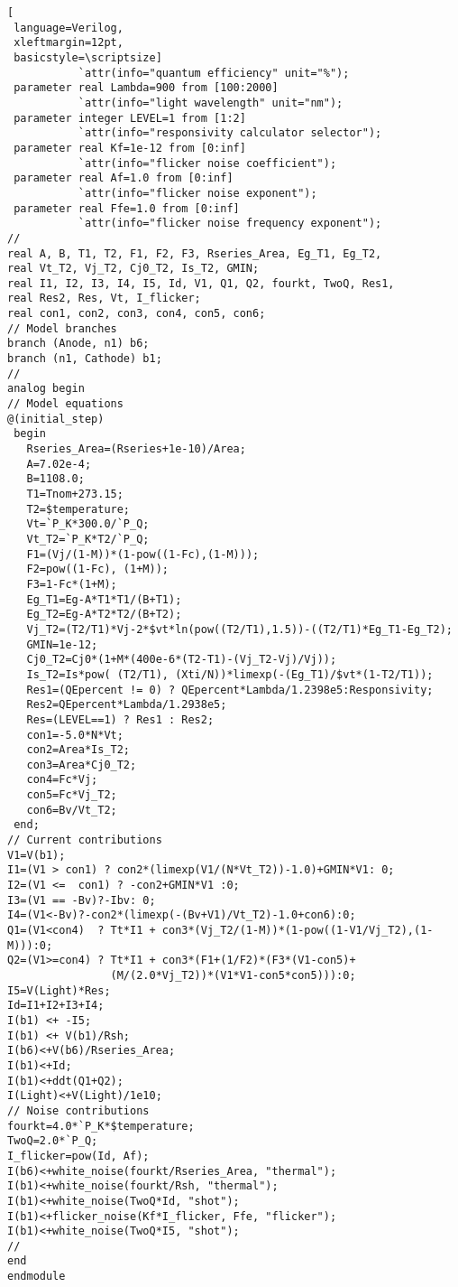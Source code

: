 \begin{lstlisting}[
 language=Verilog, 
 xleftmargin=12pt,
 basicstyle=\scriptsize]
           `attr(info="quantum efficiency" unit="%");
 parameter real Lambda=900 from [100:2000]        
           `attr(info="light wavelength" unit="nm");
 parameter integer LEVEL=1 from [1:2]             
           `attr(info="responsivity calculator selector");
 parameter real Kf=1e-12 from [0:inf]             
           `attr(info="flicker noise coefficient");
 parameter real Af=1.0 from [0:inf]               
           `attr(info="flicker noise exponent");
 parameter real Ffe=1.0 from [0:inf]              
           `attr(info="flicker noise frequency exponent");
//
real A, B, T1, T2, F1, F2, F3, Rseries_Area, Eg_T1, Eg_T2,
real Vt_T2, Vj_T2, Cj0_T2, Is_T2, GMIN;
real I1, I2, I3, I4, I5, Id, V1, Q1, Q2, fourkt, TwoQ, Res1,
real Res2, Res, Vt, I_flicker;
real con1, con2, con3, con4, con5, con6;
// Model branches
branch (Anode, n1) b6;
branch (n1, Cathode) b1;
//
analog begin
// Model equations
@(initial_step)
 begin
   Rseries_Area=(Rseries+1e-10)/Area;
   A=7.02e-4;
   B=1108.0;
   T1=Tnom+273.15;
   T2=$temperature;
   Vt=`P_K*300.0/`P_Q;
   Vt_T2=`P_K*T2/`P_Q;
   F1=(Vj/(1-M))*(1-pow((1-Fc),(1-M)));
   F2=pow((1-Fc), (1+M));
   F3=1-Fc*(1+M);
   Eg_T1=Eg-A*T1*T1/(B+T1);
   Eg_T2=Eg-A*T2*T2/(B+T2);
   Vj_T2=(T2/T1)*Vj-2*$vt*ln(pow((T2/T1),1.5))-((T2/T1)*Eg_T1-Eg_T2);
   GMIN=1e-12;
   Cj0_T2=Cj0*(1+M*(400e-6*(T2-T1)-(Vj_T2-Vj)/Vj));
   Is_T2=Is*pow( (T2/T1), (Xti/N))*limexp(-(Eg_T1)/$vt*(1-T2/T1));
   Res1=(QEpercent != 0) ? QEpercent*Lambda/1.2398e5:Responsivity;
   Res2=QEpercent*Lambda/1.2938e5;
   Res=(LEVEL==1) ? Res1 : Res2;
   con1=-5.0*N*Vt;
   con2=Area*Is_T2;
   con3=Area*Cj0_T2;
   con4=Fc*Vj;
   con5=Fc*Vj_T2;
   con6=Bv/Vt_T2;
 end;
// Current contributions
V1=V(b1);
I1=(V1 > con1) ? con2*(limexp(V1/(N*Vt_T2))-1.0)+GMIN*V1: 0;
I2=(V1 <=  con1) ? -con2+GMIN*V1 :0;
I3=(V1 == -Bv)?-Ibv: 0;
I4=(V1<-Bv)?-con2*(limexp(-(Bv+V1)/Vt_T2)-1.0+con6):0;
Q1=(V1<con4)  ? Tt*I1 + con3*(Vj_T2/(1-M))*(1-pow((1-V1/Vj_T2),(1-M))):0;
Q2=(V1>=con4) ? Tt*I1 + con3*(F1+(1/F2)*(F3*(V1-con5)+
                (M/(2.0*Vj_T2))*(V1*V1-con5*con5))):0;
I5=V(Light)*Res;
Id=I1+I2+I3+I4;
I(b1) <+ -I5;
I(b1) <+ V(b1)/Rsh;
I(b6)<+V(b6)/Rseries_Area;
I(b1)<+Id;
I(b1)<+ddt(Q1+Q2);
I(Light)<+V(Light)/1e10;
// Noise contributions
fourkt=4.0*`P_K*$temperature;
TwoQ=2.0*`P_Q;
I_flicker=pow(Id, Af);
I(b6)<+white_noise(fourkt/Rseries_Area, "thermal");
I(b1)<+white_noise(fourkt/Rsh, "thermal");
I(b1)<+white_noise(TwoQ*Id, "shot");
I(b1)<+flicker_noise(Kf*I_flicker, Ffe, "flicker");
I(b1)<+white_noise(TwoQ*I5, "shot");
//
end
endmodule
\end{lstlisting}

